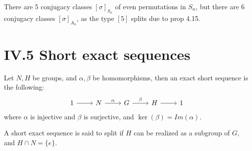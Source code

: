 \begin{thm}
    There are 5 conjugacy classes $[\sigma]_{S_n}$ of even permutations in $S_n$, but there are 6 conjugacy classes $[\sigma]_{A_n}$, as the type $[5]$ splits due to prop 4.15.
\end{thm}

\section{IV.5 Short exact sequences}
\begin{defn}
    Let $N,H$ be groups, and $\alpha, \beta$ be homomorphisms, then an exact short sequence is the following:
    \[\begin{tikzcd}
        1 & N & G & H & 1
        \arrow[from=1-1, to=1-2]
        \arrow["\alpha", from=1-2, to=1-3]
        \arrow["\beta", from=1-3, to=1-4]
        \arrow[from=1-4, to=1-5]
    \end{tikzcd}\]
    where $\alpha$ is injective and $\beta$ is surjective, and $\ker(\beta)=Im(\alpha)$.

    A short exact sequence is said to split if $H$ can be realized as a subgroup of $G$, and $H\cap N=\{e\}$.
\end{defn}
